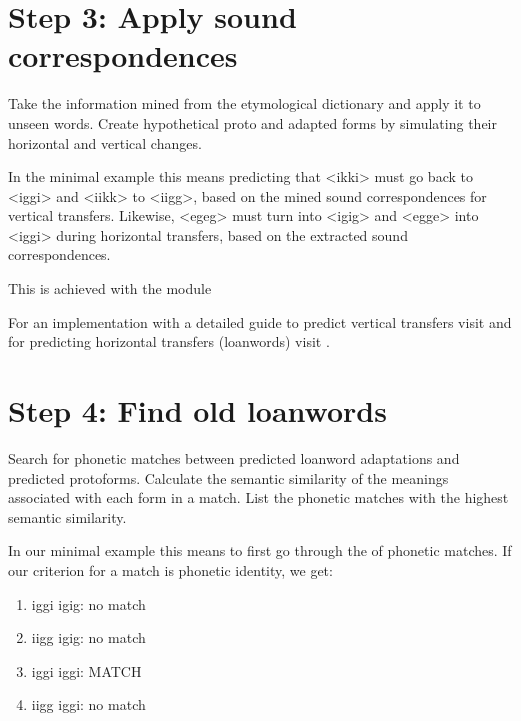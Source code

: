 \documentclass[letterpaper,10pt,english]{sphinxmanual}
\begin{document}
\section{Step 3: Apply sound correspondences}
\label{\detokenize{tutorial:step-3-apply-sound-correspondences}}
\sphinxAtStartPar
Take the information mined from the etymological dictionary
and apply it to unseen words.
Create hypothetical proto\sphinxhyphen{} and adapted forms by simulating their horizontal
and vertical changes.

\sphinxAtStartPar
In the minimal example this means predicting that \textless{}ikki\textgreater{} must go back to
\textless{}iggi\textgreater{} and \textless{}iikk\textgreater{} to \textless{}iigg\textgreater{}, based on the mined sound correspondences for
vertical transfers. Likewise, \textless{}egeg\textgreater{} must turn into \textless{}igig\textgreater{} and \textless{}egge\textgreater{} into
\textless{}iggi\textgreater{} during horizontal transfers, based on the extracted sound
correspondences.

\sphinxAtStartPar
This is achieved with the 
module

\sphinxAtStartPar
For an implementation with a detailed guide to predict vertical transfers visit
 and for
predicting horizontal transfers (loanwords) visit
.


\section{Step 4: Find old loanwords}
\label{\detokenize{tutorial:step-4-find-old-loanwords}}
\sphinxAtStartPar
Search for phonetic matches between predicted loanword adaptations
and predicted proto\sphinxhyphen{}forms. Calculate the semantic similarity of
the meanings associated with each form in a match. List the phonetic matches
with the highest semantic similarity.

\sphinxAtStartPar
In our minimal example this means to first go through the  of phonetic matches.
If our criterion for a match is phonetic identity, we get:
\begin{enumerate}
%
\item {} 
\sphinxAtStartPar
iggi \sphinxhyphen{} igig: no match

\item {} 
\sphinxAtStartPar
iigg \sphinxhyphen{} igig: no match

\item {} 
\sphinxAtStartPar
iggi \sphinxhyphen{} iggi: MATCH

\item {} 
\sphinxAtStartPar
iigg \sphinxhyphen{} iggi: no match

\end{enumerate}
\end{document}
